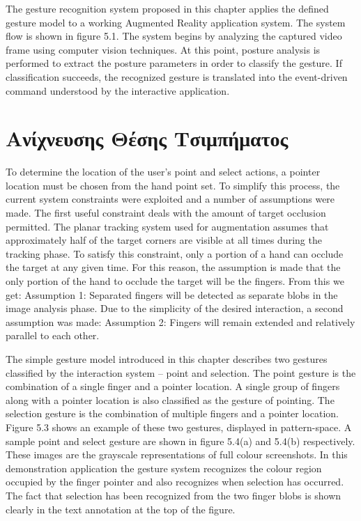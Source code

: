 The gesture recognition system proposed in this chapter applies the defined gesture model to a working Augmented Reality application system. The system flow is shown in figure 5.1. The system begins by analyzing the captured video frame using computer vision techniques. At this point, posture analysis is performed to extract the posture parameters in order to classify the gesture. If classification succeeds, the recognized gesture is translated into the event-driven command understood by the interactive application.


\section{Ανίχνευσης Θέσης Τσιμπήματος}


To determine the location of the user’s point and select actions, a pointer location must be chosen from the hand point set. To simplify this process, the current system constraints were exploited and a number of assumptions were made. The first useful constraint deals with the amount of target occlusion permitted. The planar tracking system used for augmentation assumes that approximately half of the target corners are visible at all times during the tracking phase. To satisfy this constraint, only a portion of a hand can occlude the target at any given time. For this reason, the assumption is made that the only portion of the hand to occlude the target will be the fingers. From this we get: Assumption 1: Separated fingers will be detected as separate blobs in the image analysis phase. Due to the simplicity of the desired interaction, a second assumption was made: Assumption 2: Fingers will remain extended and relatively parallel to each other.

The simple gesture model introduced in this chapter describes two gestures classified by the interaction system – point and selection. The point gesture is the combination of a single finger and a pointer location. A single group of fingers along with a pointer location is also classified as the gesture of pointing. The selection gesture is the combination of multiple fingers and a pointer location. Figure 5.3 shows an example of these two gestures, displayed in pattern-space. A sample point and select gesture are shown in figure 5.4(a) and 5.4(b) respectively. These images are the grayscale representations of full colour screenshots. In this demonstration application the gesture system recognizes the colour region occupied by the finger pointer and also recognizes when selection has occurred. The fact that selection has been recognized from the two finger blobs is shown clearly in the text annotation at the top of the figure.

